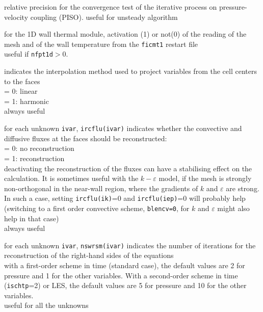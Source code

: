{relative precision for the convergence test of the iterative process on
pressure-velocity coupling (PISO).
useful for unsteady algorithm
}

{for the  1D wall thermal module, activation (1) or not(0) of the reading
of the mesh and of the wall temperature from the {\tt ficmt1} restart file\\
useful if {\tt nfpt1d}$>$0.}

{indicates the interpolation method used to project variables from the cell
centers to the faces\\
\hspace*{1.3cm}= 0: linear\\
\hspace*{1.3cm}= 1: harmonic\\
always useful}

{for each unknown {\tt ivar}, {\tt ircflu(ivar)} indicates whether the convective
and diffusive fluxes at the faces should be reconstructed: \\
\hspace*{1.3cm}= 0: no reconstruction\\
\hspace*{1.3cm}= 1: reconstruction\\
deactivating the reconstruction of the fluxes can have a stabilising effect on
the calculation. It is sometimes useful with the $k-\varepsilon$ model, if the
mesh is strongly non-orthogonal in the near-wall region, where the gradients of
$k$ and $\varepsilon$ are strong. In such a case, setting {\tt ircflu(ik)}=0
and {\tt ircflu(iep)}=0 will probably help (switching to a first order
convective scheme, {\tt blencv=0}, for $k$ and $\varepsilon$ might also help in
that case)\\
always useful}

{for each unknown {\tt ivar}, {\tt nswrsm(ivar)} indicates the number of iterations for the
reconstruction of the right-hand sides of the equations\\
with a first-order scheme in time
(standard case), the default values are 2 for pressure and 1 for the
other variables. With a second-order scheme in time ({\tt ischtp}=2) or LES, the
default values are 5 for pressure and 10 for the other variables.\\
useful for all the unknowns}

